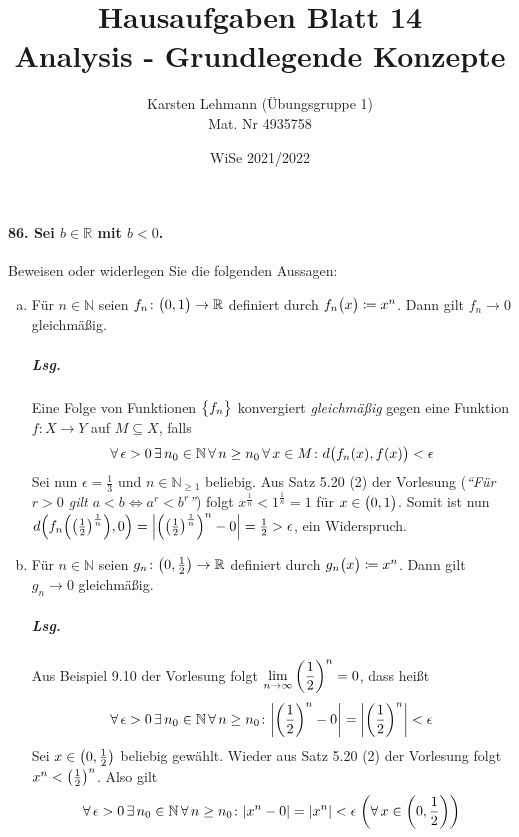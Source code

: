 \documentclass{scrreprt}
\author{Karsten Lehmann (Übungsgruppe 1)\\Mat. Nr 4935758}
\date{WiSe 2021/2022}
\title{Hausaufgaben Blatt 14\\Analysis - Grundlegende Konzepte}
\begin{document}
\paragraph{86. Sei $b \in \mathbb{R}$ mit $b < 0$.}
Beweisen oder widerlegen Sie die folgenden Aussagen:
\begin{enumerate}[(a)]
\item Für $n \in \mathbb{N}$ seien $f_n \colon \qty\big(0, 1) \to \mathbb{R}$
  definiert durch $f_n\qty\big(x) \coloneqq x^n$.
  Dann gilt $f_n \to 0$ gleichmäßig.
  \subparagraph{Lsg.} Eine Folge von Funktionen $\qty\big{f_n}$ konvergiert
  \emph{gleichmäßig} gegen eine Funktion $f \colon X \to Y$ auf $M \subseteq X$,
  falls
  \[
    \forall\, \epsilon > 0 \,\exists\, n_0 \in \mathbb{N}
    \,\forall\, n \geq n_0 \,\forall\, x \in M \colon
    d\qty\big(f_n(x), f(x)) < \epsilon
  \]
  Sei nun $\epsilon = \frac{1}{3}$ und $n \in \mathbb{N}_{\geq 1}$ beliebig.
  Aus Satz 5.20 (2) der Vorlesung
  (\emph{``Für $r > 0$ gilt $a < b \iff a^r < b^r$''}) folgt
  $x^{\frac{1}{n}} < 1^{\frac{1}{n}} = 1$ für $x \in \qty\big(0, 1)$.
  Somit ist nun $d\qty(f_n\qty(\qty(\frac{1}{2})^{\frac{1}{n}}), 0) =
  \abs{\qty(\qty(\frac{1}{2})^{\frac{1}{n}})^n - 0} = \frac{1}{2} > \epsilon$,
  ein Widerspruch.

\item Für $n \in \mathbb{N}$ seien
  $g_n \colon \qty(0, \frac{1}{2}) \to \mathbb{R}$ definiert durch
  $g_n\qty\big(x) \coloneqq x^n$.
  Dann gilt $g_n \to 0$ gleichmäßig.
  \subparagraph{Lsg.} Aus Beispiel 9.10 der Vorlesung folgt
  $\displaystyle \lim_{n \to \infty} \qty(\frac{1}{2})^n = 0$, dass
  heißt
  \[
    \forall\, \epsilon > 0 \,\exists\, n_0 \in \mathbb{N}
    \,\forall\, n \geq n_0 \colon \abs{\qty(\frac{1}{2})^n - 0} =
    \abs{\qty(\frac{1}{2})^n} < \epsilon
  \]
  Sei $x \in \qty(0, \frac{1}{2})$ beliebig gewählt.
  Wieder aus Satz 5.20 (2) der Vorlesung folgt $x^n < \qty(\frac{1}{2})^n$.
  Also gilt
  \[
    \forall\, \epsilon > 0 \,\exists\, n_0 \in \mathbb{N}
    \,\forall\, n \geq n_0 \colon \abs{x^n - 0} =
    \abs{x^n} < \epsilon \; \qty(\forall\, x \in \qty(0, \frac{1}{2}))
  \]
\end{enumerate}
\end{document}
